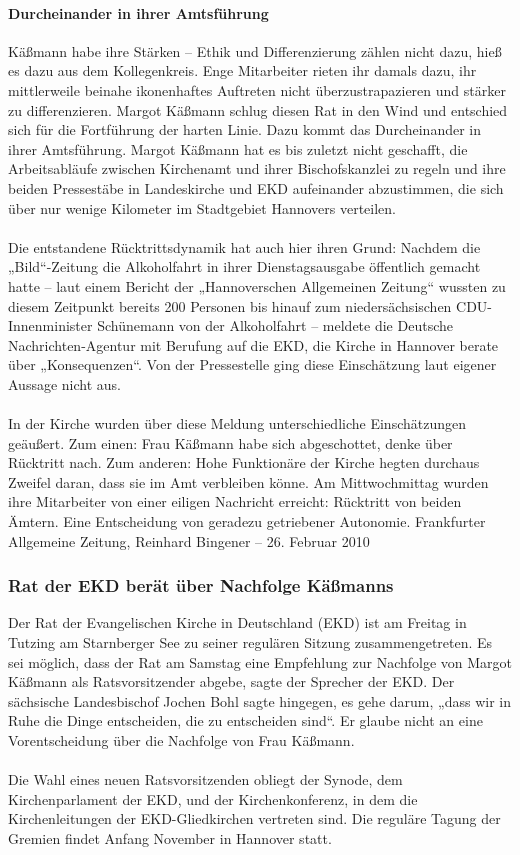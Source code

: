 \documentclass[a4paper,12pt,oneside]{scrbook}
\begin{document}
\paragraph{Durcheinander in ihrer Amtsführung}
Käßmann habe ihre Stärken – Ethik und Differenzierung zählen nicht dazu, hieß es dazu aus dem Kollegenkreis. Enge Mitarbeiter rieten ihr damals dazu, ihr mittlerweile beinahe ikonenhaftes Auftreten nicht überzustrapazieren und stärker zu differenzieren. Margot Käßmann schlug diesen Rat in den Wind und entschied sich für die Fortführung der harten Linie. Dazu kommt das Durcheinander in ihrer Amtsführung. Margot Käßmann hat es bis zuletzt nicht geschafft, die Arbeitsabläufe zwischen Kirchenamt und ihrer Bischofskanzlei zu regeln und ihre beiden Pressestäbe in Landeskirche und EKD aufeinander abzustimmen, die sich über nur wenige Kilometer im Stadtgebiet Hannovers verteilen.
\\\\
Die entstandene Rücktrittsdynamik hat auch hier ihren Grund: Nachdem die „Bild“-Zeitung die Alkoholfahrt in ihrer Dienstagsausgabe öffentlich gemacht hatte – laut einem Bericht der „Hannoverschen Allgemeinen Zeitung“ wussten zu diesem Zeitpunkt bereits 200 Personen bis hinauf zum niedersächsischen CDU-Innenminister Schünemann von der Alkoholfahrt – meldete die Deutsche Nachrichten-Agentur mit Berufung auf die EKD, die Kirche in Hannover berate über „Konsequenzen“. Von der Pressestelle ging diese Einschätzung laut eigener Aussage nicht aus.
\\\\
In der Kirche wurden über diese Meldung unterschiedliche Einschätzungen geäußert. Zum einen: Frau Käßmann habe sich abgeschottet, denke über Rücktritt nach. Zum anderen: Hohe Funktionäre der Kirche hegten durchaus Zweifel daran, dass sie im Amt verbleiben könne. Am Mittwochmittag wurden ihre Mitarbeiter von einer eiligen Nachricht erreicht: Rücktritt von beiden Ämtern. Eine Entscheidung von geradezu getriebener Autonomie.
\newpage
Frankfurter Allgemeine Zeitung, Reinhard Bingener \hfill -- \hfill 26. Februar 2010
\subsubsection{Rat der EKD berät über Nachfolge Käßmanns}
Der Rat der Evangelischen Kirche in Deutschland (EKD) ist am Freitag in Tutzing am Starnberger See zu seiner regulären Sitzung zusammengetreten. Es sei möglich, dass der Rat am Samstag eine Empfehlung zur Nachfolge von Margot Käßmann als Ratsvorsitzender abgebe, sagte der Sprecher der EKD. Der sächsische Landesbischof Jochen Bohl sagte hingegen, es gehe darum, „dass wir in Ruhe die Dinge entscheiden, die zu entscheiden sind“. Er glaube nicht an eine Vorentscheidung über die Nachfolge von Frau Käßmann.
\\\\
Die Wahl eines neuen Ratsvorsitzenden obliegt der Synode, dem Kirchenparlament der EKD, und der Kirchenkonferenz, in dem die Kirchenleitungen der EKD-Gliedkirchen vertreten sind. Die reguläre Tagung der Gremien findet Anfang November in Hannover statt.
\end{document}
